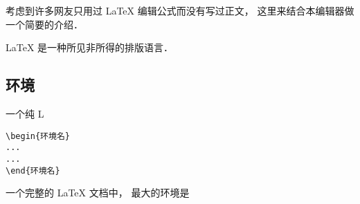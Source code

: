 
考虑到许多网友只用过 LaTeX 编辑公式而没有写过正文， 这里来结合本编辑器做一个简要的介绍．

LaTeX 是一种所见非所得的排版语言． 

\subsection{环境}
一个纯 L
\begin{lstlisting}
\begin{环境名}
...
...
\end{环境名}
\end{lstlisting}

一个完整的 LaTeX 文档中， 最大的环境是